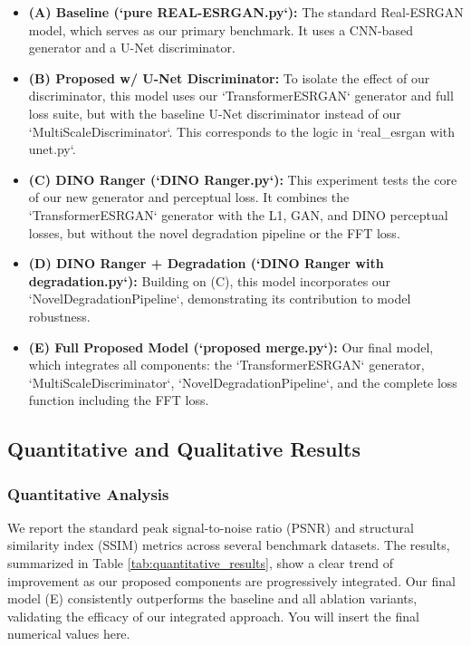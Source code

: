 \documentclass{article}
\begin{document}
\begin{itemize}
    \item \textbf{(A) Baseline (`pure REAL-ESRGAN.py`):} The standard Real-ESRGAN model, which serves as our primary benchmark. It uses a CNN-based generator and a U-Net discriminator.
    \item \textbf{(B) Proposed w/ U-Net Discriminator:} To isolate the effect of our discriminator, this model uses our `TransformerESRGAN` generator and full loss suite, but with the baseline U-Net discriminator instead of our `MultiScaleDiscriminator`. This corresponds to the logic in `real_esrgan with unet.py`.
    \item \textbf{(C) DINO Ranger (`DINO Ranger.py`):} This experiment tests the core of our new generator and perceptual loss. It combines the `TransformerESRGAN` generator with the L1, GAN, and DINO perceptual losses, but without the novel degradation pipeline or the FFT loss.
    \item \textbf{(D) DINO Ranger + Degradation (`DINO Ranger with degradation.py`):} Building on (C), this model incorporates our `NovelDegradationPipeline`, demonstrating its contribution to model robustness.
    \item \textbf{(E) Full Proposed Model (`proposed merge.py`):} Our final model, which integrates all components: the `TransformerESRGAN` generator, `MultiScaleDiscriminator`, `NovelDegradationPipeline`, and the complete loss function including the FFT loss.
\end{itemize}

\subsection{Quantitative and Qualitative Results}

\subsubsection{Quantitative Analysis}
We report the standard peak signal-to-noise ratio (PSNR) and structural similarity index (SSIM) metrics across several benchmark datasets. The results, summarized in Table \ref{tab:quantitative_results}, show a clear trend of improvement as our proposed components are progressively integrated. Our final model (E) consistently outperforms the baseline and all ablation variants, validating the efficacy of our integrated approach. You will insert the final numerical values here.
\end{document}
